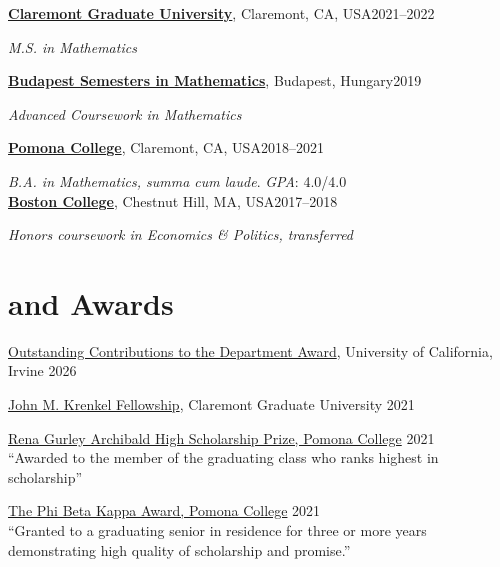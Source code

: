 \documentclass[margin,line]{res}
\begin{document}
\begin{resume}
{\bf \href{https://www.cgu.edu/}{Claremont Graduate University}}, Claremont, CA, USA\hfill 2021--2022

\vspace{-.35cm}
{\em M.S. in Mathematics} 

{\bf \href{https://budapestsemesters.com/}{Budapest Semesters in Mathematics}}, Budapest, Hungary\hfill 2019

\vspace{-.35cm}
{\em Advanced Coursework in Mathematics}

{\bf \href{https://www.pomona.edu/}{Pomona College}}, Claremont, CA, USA\hfill 2018--2021

\vspace{-.35cm}
{\em B.A. in Mathematics, summa cum laude}. \textit{GPA}: 4.0/4.0 \\


{\bf \href{https://www.bc.edu/}{Boston College}}, Chestnut Hill, MA, USA\hfill 2017--2018

\vspace{-.35cm}
{\em Honors coursework in Economics \& Politics, transferred}

\vspace{-.6cm}




\section{ and Awards} 
\vspace*{0.67cm}


\href{https://www.math.uci.edu/node/36765}{Outstanding Contributions to the Department Award}, University of California, Irvine \hfill 2026

\vspace*{-2mm}

\href{https://www.cgu.edu/fellowships/endowed-fellowships/}{John M. Krenkel Fellowship}, Claremont Graduate University \hfill 2021

\vspace*{-2mm}
\href{https://www.pomona.edu/students/academic-awards-and-distinctions}{{\color{Maroon} Rena Gurley Archibald High Scholarship Prize, Pomona College}} \hfill 2021\\
{\color{gray} ``Awarded to the member of the graduating class who ranks highest in scholarship''} 

\vspace*{-2mm}
\href{https://www.pomona.edu/students/academic-awards-and-distinctions}{{\color{Maroon} The Phi Beta Kappa Award, Pomona College}} \hfill 2021\\
{\color{gray} ``Granted to a graduating senior in residence for three or more years demonstrating high quality of scholarship and promise.''}


\end{resume}
\end{document}
